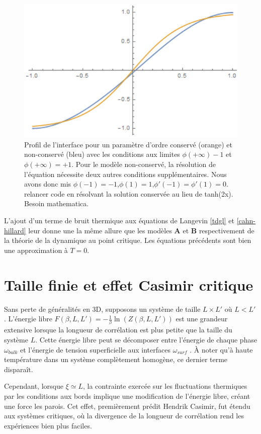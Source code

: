 \begin{figure}
    \centering
    \includegraphics[width=0.5\linewidth]{intro/profil-KawVsGlau.png}
    \caption{Profil de l'interface pour un paramètre d'ordre conservé (orange) et non-conservé (bleu) avec les conditions aux limites $\phi(+\infty)-1$ et $\phi(+\infty)=+1$. Pour le modèle non-conservé, la résolution de l'équation \label{langevin-kawasaki} nécessite deux autres conditions supplémentaires. Nous avons donc mis $\phi(-1)=-1$,$\phi(1)=1$,$\phi'(-1)=\phi'(1)=0$. {\color{red} relancer code en résolvant la solution conservée au lieu de tanh(2x). Besoin mathematica.}}
\end{figure}

L'ajout d'un terme de bruit thermique aux équations de Langevin \ref{tdgl} et \ref{cahn-hillard} leur donne une la même allure que les modèles \textbf{A} et \textbf{B} respectivement de la théorie de la dynamique au point critique\cite{hohenberg_theory_1977}. Les équations précédents sont bien une approximation à $T=0$.


    \section{Taille finie et effet Casimir critique}
    
Sans perte de généralités en 3D, supposons un système de taille $L\times L' $ où $L<L'$. L'énergie libre $F(\beta,L,L') = - \frac{1}{\beta} \ln ( Z(\beta,L,L'))$ est une grandeur extensive lorsque la longueur de corrélation est plus petite que la taille du système $L$. 
Cette énergie libre peut se décomposer entre l'énergie de chaque phase $\omega_{bulk}$ et l'énergie de tension superficielle aux interfaces $\omega_{surf}$ \cite[§4]{cardozo_finite_2015}. À noter qu'à haute température dans un système complètement homogène, ce dernier terme disparaît.

Cependant, lorsque $\xi \simeq L$, la contrainte exercée sur les fluctuations thermiques par les conditions aux bords implique une modification de l'énergie libre, créant une force les parois. Cet effet, premièrement prédit Hendrik Casimir\cite{h_b_g_casimir_attraction_1948}, fut étendu aux systèmes critiques\cite{nikolic_is_2017}, où la divergence de la longueur de corrélation rend les expériences bien plus faciles\cite{nguyen_controlling_2013}.

